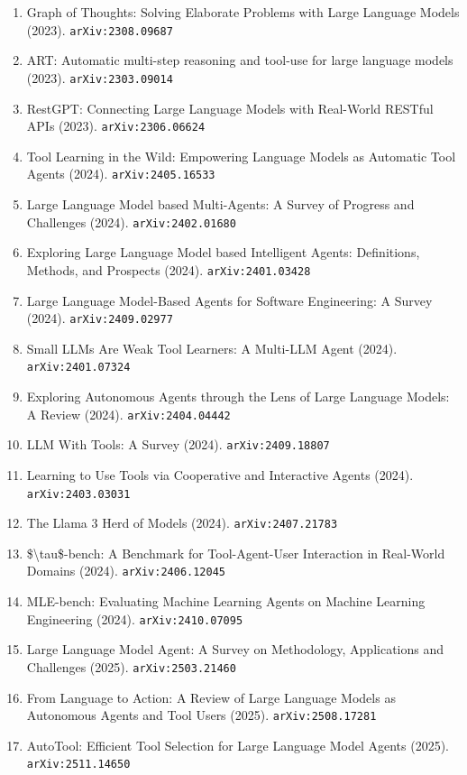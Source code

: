 \documentclass[11pt]{article}
\begin{document}
\begin{enumerate}
  Environments via Large Language Models with Text-based Knowledge and Memory (2023). \texttt{arXiv:2305.17144}
  \item Graph of Thoughts: Solving Elaborate Problems with Large Language Models (2023). \texttt{arXiv:2308.09687}
  \item ART: Automatic multi-step reasoning and tool-use for large language
  models (2023). \texttt{arXiv:2303.09014}
  \item RestGPT: Connecting Large Language Models with Real-World RESTful APIs (2023). \texttt{arXiv:2306.06624}
  \item Tool Learning in the Wild: Empowering Language Models as Automatic Tool
  Agents (2024). \texttt{arXiv:2405.16533}
  \item Large Language Model based Multi-Agents: A Survey of Progress and
  Challenges (2024). \texttt{arXiv:2402.01680}
  \item Exploring Large Language Model based Intelligent Agents: Definitions,
  Methods, and Prospects (2024). \texttt{arXiv:2401.03428}
  \item Large Language Model-Based Agents for Software Engineering: A Survey (2024). \texttt{arXiv:2409.02977}
  \item Small LLMs Are Weak Tool Learners: A Multi-LLM Agent (2024). \texttt{arXiv:2401.07324}
  \item Exploring Autonomous Agents through the Lens of Large Language Models: A
  Review (2024). \texttt{arXiv:2404.04442}
  \item LLM With Tools: A Survey (2024). \texttt{arXiv:2409.18807}
  \item Learning to Use Tools via Cooperative and Interactive Agents (2024). \texttt{arXiv:2403.03031}
  \item The Llama 3 Herd of Models (2024). \texttt{arXiv:2407.21783}
  \item \$\textbackslash{}tau\$-bench: A Benchmark for Tool-Agent-User Interaction in Real-World
  Domains (2024). \texttt{arXiv:2406.12045}
  \item MLE-bench: Evaluating Machine Learning Agents on Machine Learning
  Engineering (2024). \texttt{arXiv:2410.07095}
  \item Large Language Model Agent: A Survey on Methodology, Applications and
  Challenges (2025). \texttt{arXiv:2503.21460}
  \item From Language to Action: A Review of Large Language Models as Autonomous Agents and Tool Users (2025). \texttt{arXiv:2508.17281}
  \item AutoTool: Efficient Tool Selection for Large Language Model Agents (2025). \texttt{arXiv:2511.14650}

\end{enumerate}
\end{document}

